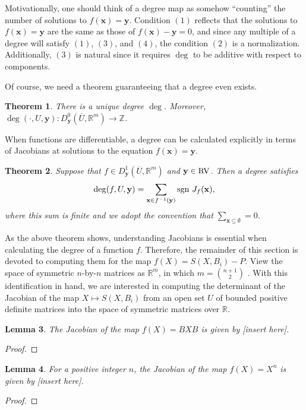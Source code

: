 \documentclass{amsart}
\newtheorem{thm}{Theorem}[section]
\newtheorem{lem}[thm]{Lemma}
\theoremstyle{definition}
\theoremstyle{remark}
\numberwithin{equation}{section}
\newcommand{\<}{\langle}
\renewcommand{\>}{\rangle}
\begin{document}
Motivationally, one should think of a degree map as somehow ``counting'' the number of solutions to $f(\mathbf x) = \mathbf y$.  Condition $(1)$ reflects that the solutions to $f(\mathbf x) = \mathbf y$ are the same as those of $f(\mathbf x)- \mathbf y = 0$, and since any multiple of a degree will satisfy $(1)$, $(3)$, and $(4)$, the condition $(2)$ is a normalization.  Additionally, $(3)$ is natural since it requires $\deg$ to be additive with respect to components.  

Of course, we need a theorem guaranteeing that a degree even exists.

\begin{thm}
There is a unique degree $\deg$.  Moreover, $\deg(\cdot, U, \mathbf y):  D^0_{\mathbf{y}}(\overline{U},\mathbb R^m) \to \mathbb Z$.
\end{thm}

When functions are differentiable, a degree can be calculated explicitly in terms of Jacobians at solutions to the equation $f(\mathbf x) = \mathbf y$.

\begin{thm}\label{sumjacob}
Suppose that $f \in D^1_{\mathbf y}(\overline{U},\mathbb R^m)$ and $\mathbf y \in \text{\rm{RV}}$.  Then a degree satisfies \[\deg(f,U,\mathbf y) = \sum_{\mathbf x \in f^{-1}(\mathbf y)} {\text{\rm{sgn}} \  J_f(\mathbf x)},\] where this sum is finite and we adopt the convention that $\sum_{\mathbf x \subseteq  \emptyset} = 0$.
\end{thm}

As the above theorem shows, understanding Jacobians is essential when calculating the degree of a function $f$.  Therefore, the remainder of this section is devoted to computing them for the map $f(X) = S(X,B_i) - P$.  View the space of symmetric $n$-by-$n$ matrices as $\mathbb R^{m}$, in which $m = {n+1 \choose 2}$ .  With this identification in hand, we are interested in computing the determinant of the Jacobian of the map $X \mapsto S(X,B_i)$ from an open set $U$ of bounded positive definite matrices into the space of symmetric matrices over $\mathbb R$.

\begin{lem}
The Jacobian of the map $f(X) = BXB$ is given by [insert here].
\end{lem}
\begin{proof}

\end{proof}

\begin{lem}
For a positive integer $n$, the Jacobian of the map $f(X) = X^n$ is given by [insert here].
\end{lem}
\begin{proof}

\end{proof}
\end{document}
